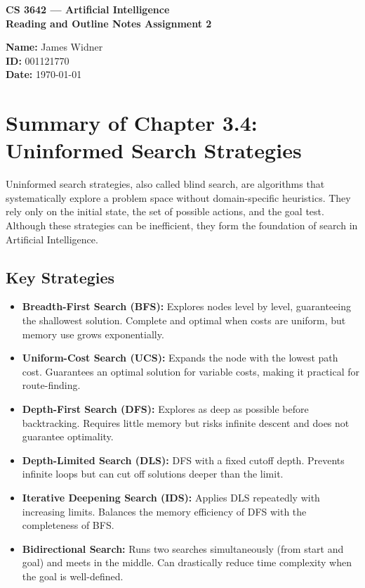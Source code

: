 \documentclass[11pt]{article}
\begin{document}
\begin{center}
{\Large \textbf{CS 3642 --- Artificial Intelligence}}\\[4pt]
\textbf{Reading and Outline Notes Assignment 2}\\[2pt]
\end{center}

\noindent
\textbf{Name:} James Widner \\
\textbf{ID:} 001121770 \\
\textbf{Date: }{\today} 

\section*{Summary of Chapter 3.4: Uninformed Search Strategies}

Uninformed search strategies, also called blind search, are algorithms that systematically explore a problem space without domain-specific heuristics. They rely only on the initial state, the set of possible actions, and the goal test. Although these strategies can be inefficient, they form the foundation of search in Artificial Intelligence.

\subsection*{Key Strategies}
\begin{itemize}
  \item \textbf{Breadth-First Search (BFS):} Explores nodes level by level, guaranteeing the shallowest solution. Complete and optimal when costs are uniform, but memory use grows exponentially.
  \item \textbf{Uniform-Cost Search (UCS):} Expands the node with the lowest path cost. Guarantees an optimal solution for variable costs, making it practical for route-finding.
  \item \textbf{Depth-First Search (DFS):} Explores as deep as possible before backtracking. Requires little memory but risks infinite descent and does not guarantee optimality.
  \item \textbf{Depth-Limited Search (DLS):} DFS with a fixed cutoff depth. Prevents infinite loops but can cut off solutions deeper than the limit.
  \item \textbf{Iterative Deepening Search (IDS):} Applies DLS repeatedly with increasing limits. Balances the memory efficiency of DFS with the completeness of BFS.
  \item \textbf{Bidirectional Search:} Runs two searches simultaneously (from start and goal) and meets in the middle. Can drastically reduce time complexity when the goal is well-defined.
\end{itemize}
\end{document}
